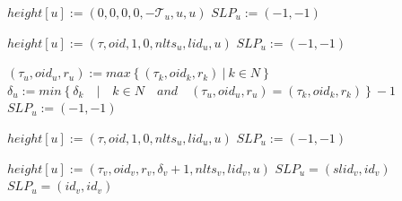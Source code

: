 \begin{algorithm}
	\caption{$ELECTSELF$}
	\begin{algorithmic}[1]
		\State $height[u] := (0,0,0,0,-\mathcal{T}_u ,u,u)$
		\State $SLP_u := (-1, -1)$
	\end{algorithmic}
\end{algorithm}

\begin{algorithm}
	\caption{$REFLECTREFLEVEL$}
	\begin{algorithmic}[1]
		\State $height[u] := (\tau, oid, 1, 0, nlts_u ,lid_u ,u)$
		\State $SLP_u := (-1, -1)$
	\end{algorithmic}
\end{algorithm}
\begin{algorithm}[h!]
	\caption{$PROPAGATELARGESTREFLEVEL$}
	\begin{algorithmic}[1]
		\State $ (\tau_u , oid_{u}, r_{u}) := max\left\lbrace (\tau _{k},oid_{k},r_{k})~\vert~k\in N\right\rbrace  $
		\State $ \delta _{u} := min \left\lbrace \delta _{k} \quad \vert \quad k \in N \quad and \quad (\tau _{u} , oid_{u}, r_{u}) = (\tau _{k},oid_{k},r_{k})\right\rbrace - 1 $
		\State $SLP_u := (-1,-1)$
	\end{algorithmic}
\end{algorithm}
\begin{algorithm}
	\caption{$STARTNEWREFLEVEL$}
	\begin{algorithmic}[1]
		\State $ height[u] := (\tau ,oid,1,0,nlts_{u},lid_u,u) $
		\State $SLP_u := (-1,-1)$
	\end{algorithmic}
\end{algorithm}

\begin{algorithm}
	\caption{$ADOPTLPIFPRIORITY(v)$}
	\begin{algorithmic}[1]
		\State $ height[u] := (\tau _{v} ,oid_{v},r_{v},\delta _{v}+1,nlts_{v},lid_v,u) $
		\State $ SLP_u = (slid_v, id_v)$
		\Else
		\State $SLP_u = (id_v, id_v)$
		\EndIf
		\EndIf
		
	\end{algorithmic}
\end{algorithm}


